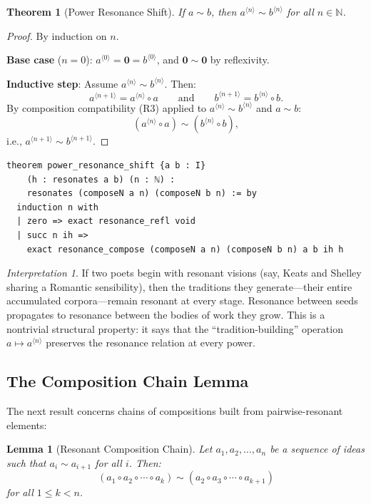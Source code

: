 \documentclass[11pt,openany]{book}
\theoremstyle{definition}
\theoremstyle{plain}
\newtheorem{theorem}[axiom]{Theorem}
\newtheorem{lemma}[axiom]{Lemma}
\theoremstyle{remark}
\newtheorem{interpretation}[axiom]{Interpretation}
\newcommand{\compose}{\circ}                 %
\newcommand{\void}{\mathbf{0}}              %
\newcommand{\res}{\sim}                      %
\newcommand{\compN}[2]{#1^{\langle #2 \rangle}} %
\begin{document}
\begin{theorem}[Power Resonance Shift]
\label{thm:power-resonance}
If $a \res b$, then $\compN{a}{n} \res \compN{b}{n}$ for all $n \in \mathbb{N}$.
\end{theorem}

\begin{proof}
By induction on $n$.

\textbf{Base case} ($n = 0$): $\compN{a}{0} = \void = \compN{b}{0}$, and $\void \res \void$ by reflexivity.

\textbf{Inductive step}: Assume $\compN{a}{n} \res \compN{b}{n}$. Then:
\[
\compN{a}{n+1} = \compN{a}{n} \compose a \qquad \text{and} \qquad \compN{b}{n+1} = \compN{b}{n} \compose b.
\]
By composition compatibility (R3) applied to $\compN{a}{n} \res \compN{b}{n}$ and $a \res b$:
\[
(\compN{a}{n} \compose a) \res (\compN{b}{n} \compose b),
\]
i.e., $\compN{a}{n+1} \res \compN{b}{n+1}$.
\end{proof}

\begin{lstlisting}
theorem power_resonance_shift {a b : I}
    (h : resonates a b) (n : ℕ) :
    resonates (composeN a n) (composeN b n) := by
  induction n with
  | zero => exact resonance_refl void
  | succ n ih =>
    exact resonance_compose (composeN a n) (composeN b n) a b ih h
\end{lstlisting}

\begin{interpretation}
If two poets begin with resonant visions (say, Keats and Shelley sharing a Romantic sensibility), then the traditions they generate---their entire accumulated corpora---remain resonant at every stage. Resonance between seeds propagates to resonance between the bodies of work they grow. This is a nontrivial structural property: it says that the ``tradition-building'' operation $a \mapsto \compN{a}{n}$ preserves the resonance relation at every power.
\end{interpretation}

\subsection{The Composition Chain Lemma}

The next result concerns chains of compositions built from pairwise-resonant elements:

\begin{lemma}[Resonant Composition Chain]
\label{lem:res-chain}
Let $a_1, a_2, \ldots, a_n$ be a sequence of ideas such that $a_i \res a_{i+1}$ for all $i$. Then:
\[
(a_1 \compose a_2 \compose \cdots \compose a_k) \res (a_2 \compose a_3 \compose \cdots \compose a_{k+1})
\]
for all $1 \leq k < n$.
\end{lemma}
\end{document}
